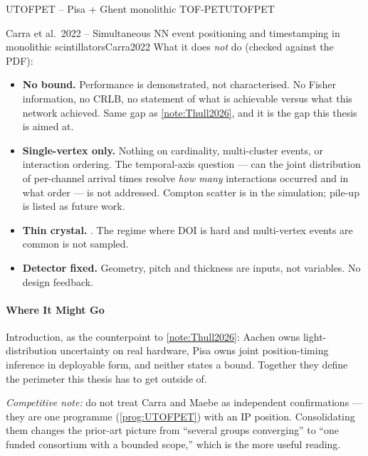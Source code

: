 \begin{programnote}{UTOFPET -- Pisa + Ghent monolithic TOF-PET}{UTOFPET}
\begin{papernote}{Carra et al.\ 2022 -- Simultaneous NN event positioning and timestamping in monolithic scintillators}{Carra2022}
What it does \emph{not} do (checked against the PDF):
\begin{itemize}
	\item \textbf{No bound.} Performance is demonstrated, not characterised. No
		Fisher information, no CRLB, no statement of what is achievable versus
		what this network achieved. Same gap as \ref{note:Thull2026}, and it is
		the gap this thesis is aimed at.
	\item \textbf{Single-vertex only.} Nothing on cardinality, multi-cluster
		events, or interaction ordering. The temporal-axis question --- can the
		joint distribution of per-channel arrival times resolve \emph{how many}
		interactions occurred and in what order --- is not addressed. Compton
		scatter is in the simulation; pile-up is listed as future work.
	\item \textbf{Thin crystal.} . The regime where DOI is hard and
		multi-vertex events are common is not sampled.
	\item \textbf{Detector fixed.} Geometry, pitch and thickness are inputs, not
		variables. No design feedback.
\end{itemize}

\paragraph{Where It Might Go}
Introduction, as the counterpoint to \ref{note:Thull2026}: Aachen owns
light-distribution uncertainty on real hardware, Pisa owns joint position-timing
inference in deployable form, and neither states a bound. Together they define
the perimeter this thesis has to get outside of.

\emph{Competitive note:} do not treat Carra and Maebe as independent
confirmations --- they are one programme (\ref{prog:UTOFPET}) with an IP
position. Consolidating them changes the prior-art picture from ``several groups
converging'' to ``one funded consortium with a bounded scope,'' which is the more
useful reading.

\end{papernote}

\end{programnote}


 
